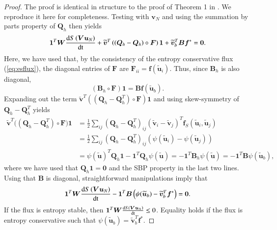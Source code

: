 \documentclass[preprint,10pt]{elsarticle}
\theoremstyle{definition}
\theoremstyle{lemma}
\theoremstyle{theorem}
\theoremstyle{assumption}
\renewcommand{\tilde}{\widetilde}
\newcommand{\td}[2]{\frac{{\rm d}#1}{{\rm d}{\rm #2}}}
\newcommand{\LRp}[1]{\left( #1 \right)}
\newcommand{\note}[1]{{\color{blue}{#1}}}
\begin{document}
\begin{proof}
The proof is identical in structure to the proof of Theorem 1 in \cite{chan2017discretely}.  We reproduce it here for completeness.
Testing with $\bm{v}_N$ and using the summation by parts property of $\bm{Q}_h$ then yields 
\begin{align*}
\bm{1}^T\bm{W}\td{S\LRp{\bm{V}\bm{u}_N}}{t}  + \tilde{\bm{v}}^T\LRp{\LRp{\bm{Q}_h-\bm{Q}_h} \circ \bm{F}}\bm{1} + \tilde{\bm{v}}_b^T\bm{B}\bm{f}^*  = \bm{0}.
\end{align*}
Here, we have used that, by the consistency of the entropy conservative flux (\ref{eq:esflux}), the diagonal entries of $\bm{F}$ are $\bm{F}_{ii} = \bm{f}\LRp{\tilde{\bm{u}}_i}$.  Thus, since $\bm{B}_h$ is also diagonal,
\[
\LRp{\bm{B}_h\circ\bm{F}}\bm{1} = \bm{B} \bm{f}(\tilde{\bm{u}}_b).
\]
Expanding out the term $\tilde{\bm{v}}^T\LRp{\LRp{\bm{Q}_h-\bm{Q}_h^T} \circ \bm{F}}\bm{1}$ and using skew-symmetry of $\bm{Q}_h-\bm{Q}_h^T$ yields
\begin{align*}
\tilde{\bm{v}}^T\big({\LRp{\bm{Q}_h-\bm{Q}_h^T}} \circ \bm{F}\big)\bm{1} &= 
\frac{1}{2}\sum_{ij} \LRp{\bm{Q}_h-\bm{Q}_h^T}_{ij} \LRp{\tilde{\bm{v}}_i-\tilde{\bm{v}}_j}^T\bm{f}_S\LRp{\tilde{\bm{u}}_i,\tilde{\bm{u}}_j}\\
&= \frac{1}{2}\sum_{ij} \LRp{\bm{Q}_h-\bm{Q}_h^T}_{ij} \LRp{\psi(\tilde{\bm{u}}_i)-\psi(\tilde{\bm{u}}_j)}\\
&= {\psi(\tilde{\bm{u}})^T\bm{Q}_h\bm{1} - \bm{1}^T\bm{Q}_h\psi(\tilde{\bm{u}})} = -\bm{1}^T\bm{B}_h\psi(\tilde{\bm{u}}) = -\bm{1}^T\bm{B}\psi(\tilde{\bm{u}}_b),
\end{align*}
where we have used that $\bm{Q}_h\bm{1} = \bm{0}$ and the SBP property in the last two lines.  Using that $\bm{B}$ is diagonal, straightforward manipulations imply that
\[
\bm{1}^T\bm{W}\td{S\LRp{\bm{V}\bm{u}_N}}{t}  - \bm{1}^T\bm{B}\LRp{\psi(\tilde{\bm{u}}_b)-\tilde{\bm{v}}_b^T\bm{f}^*}  = \bm{0}.
\]
If the flux is entropy stable, then $\bm{1}^T\bm{W}\td{S\LRp{\bm{V}\bm{u}_N}}{t} \leq 0$.  Equality holds if the flux is entropy conservative such that $\psi(\tilde{\bm{u}}_b)=\tilde{\bm{v}}_b^T\bm{f}^*$.
\end{proof}

\end{document}
